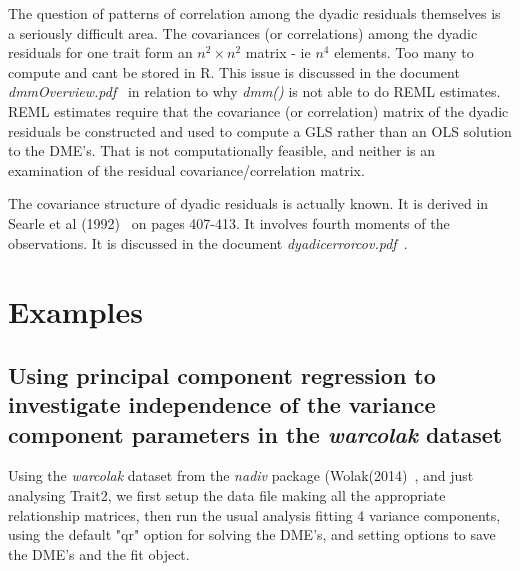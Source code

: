 \documentclass[titlepage,a4paper,12pt]{article}  %
\begin{document}
The question of patterns of correlation among the dyadic residuals themselves is a seriously difficult area. The covariances (or correlations) among the dyadic residuals for one trait form an $n^{2} \times n^{2}$ matrix - ie $n^{4}$ elements. Too many to compute and cant be stored in R. This issue is discussed in the document {\em dmmOverview.pdf}~\cite{jack:15} in relation to why {\em dmm()} is not able to do REML estimates. REML estimates require that the covariance (or correlation) matrix of the dyadic residuals be constructed and used to compute a GLS rather than an OLS solution to the DME's. That is not computationally feasible, and neither is an examination of the residual covariance/correlation matrix.

The covariance structure of dyadic residuals is actually known. It is derived in Searle et al (1992)~\cite{sear:92} on pages 407-413. It involves fourth moments of the observations. It is discussed in the document {\em dyadicerrorcov.pdf}~\cite{jack:24}.


\section{Examples}

\subsection{Using principal component regression to investigate independence of the variance component parameters in the {\em warcolak} dataset}
\label{sec:pc}
Using the {\em warcolak} dataset from the {\em nadiv} package (Wolak(2014)~\cite{wola:14}, and just analysing Trait2, we first setup the data file making all the appropriate relationship matrices, then run the usual analysis fitting 4 variance components,  using the default "qr" option for solving the DME's, and setting options to save the DME's and the fit object.
\end{document}

